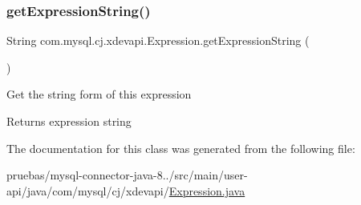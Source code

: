 \subsubsection{\texorpdfstring{get\+Expression\+String()}{getExpressionString()}}
{\footnotesize\ttfamily String com.\+mysql.\+cj.\+xdevapi.\+Expression.\+get\+Expression\+String (\begin{DoxyParamCaption}{ }\end{DoxyParamCaption})}

Get the string form of this expression

\begin{DoxyReturn}{Returns}
expression string 
\end{DoxyReturn}


The documentation for this class was generated from the following file\+:\begin{DoxyCompactItemize}
\item 
pruebas/mysql-\/connector-\/java-\/8../src/main/user-\/api/java/com/mysql/cj/xdevapi/\mbox{\hyperlink{_expression_8java}{Expression.\+java}}\end{DoxyCompactItemize}
